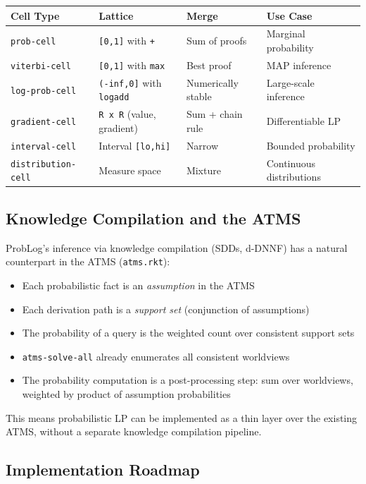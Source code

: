 \documentclass[11pt]{article}
\begin{document}
\begin{center}
\begin{tabular}{llll}
Cell Type & Lattice & Merge & Use Case\\
\hline
\texttt{prob-cell} & \texttt{[0,1]} with \texttt{+} & Sum of proofs & Marginal probability\\
\texttt{viterbi-cell} & \texttt{[0,1]} with \texttt{max} & Best proof & MAP inference\\
\texttt{log-prob-cell} & \texttt{(-inf,0]} with \texttt{logadd} & Numerically stable & Large-scale inference\\
\texttt{gradient-cell} & \texttt{R x R} (value, gradient) & Sum + chain rule & Differentiable LP\\
\texttt{interval-cell} & Interval \texttt{[lo,hi]} & Narrow & Bounded probability\\
\texttt{distribution-cell} & Measure space & Mixture & Continuous distributions\\
\end{tabular}
\end{center}
\subsection{Knowledge Compilation and the ATMS}
\label{sec:orgc93aa8e}

ProbLog's inference via knowledge compilation (SDDs, d-DNNF) has a natural
counterpart in the ATMS (\texttt{atms.rkt}):

\begin{itemize}
\item Each probabilistic fact is an \emph{assumption} in the ATMS
\item Each derivation path is a \emph{support set} (conjunction of assumptions)
\item The probability of a query is the weighted count over consistent support sets
\item \texttt{atms-solve-all} already enumerates all consistent worldviews
\item The probability computation is a post-processing step: sum over worldviews,
weighted by product of assumption probabilities
\end{itemize}

This means probabilistic LP can be implemented as a thin layer over the
existing ATMS, without a separate knowledge compilation pipeline.
\subsection{Implementation Roadmap}
\label{sec:org82258a4}
\end{document}
